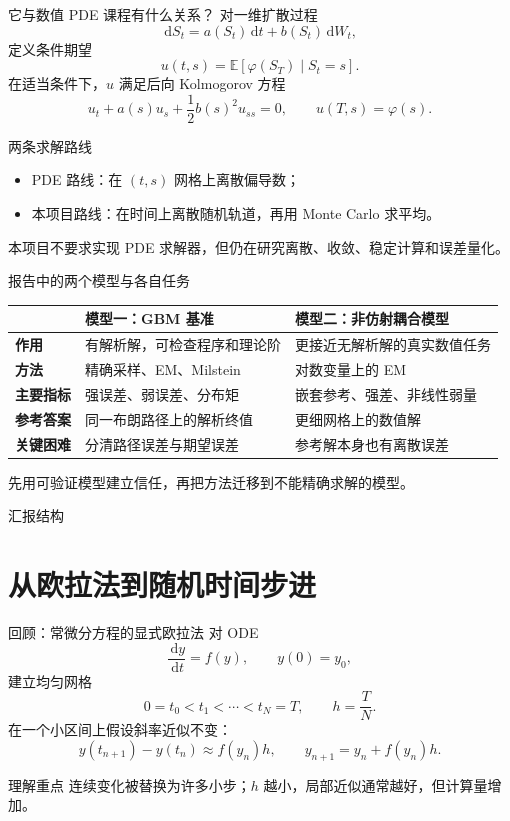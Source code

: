\documentclass[aspectratio=169,10pt,fontset=none]{ctexbeamer}
\newcommand{\E}{\mathbb{E}}
\newcommand{\dd}{\,\mathrm{d}}
\newcommand{\good}[1]{\textcolor{CourseTeal}{#1}}
\begin{document}
\begin{frame}{它与数值 PDE 课程有什么关系？}
  对一维扩散过程
  \[
    \dd S_t=a(S_t)\dd t+b(S_t)\dd W_t,
  \]
  定义条件期望
  \[
    u(t,s)=\E\!\left[\varphi(S_T)\mid S_t=s\right].
  \]
  在适当条件下，$u$ 满足后向 Kolmogorov 方程
  \[
    u_t+a(s)u_s+\frac12 b(s)^2u_{ss}=0,
    \qquad u(T,s)=\varphi(s).
  \]
  \begin{block}{两条求解路线}
    \begin{itemize}
      \item PDE 路线：在 $(t,s)$ 网格上离散偏导数；
      \item 本项目路线：在时间上离散随机轨道，再用 Monte Carlo 求平均。
    \end{itemize}
  \end{block}
  本项目不要求实现 PDE 求解器，但仍在研究\alert{离散、收敛、稳定计算和误差量化}。
\end{frame}

\begin{frame}{报告中的两个模型与各自任务}
  \begin{tabularx}{\textwidth}{>{\bfseries}p{2.4cm}XX}
    \toprule
      & 模型一：GBM 基准 & 模型二：非仿射耦合模型 \\
    \midrule
    作用 & 有解析解，可检查程序和理论阶 & 更接近无解析解的真实数值任务 \\
    方法 & 精确采样、EM、Milstein & 对数变量上的 EM \\
    主要指标 & 强误差、弱误差、分布矩 & 嵌套参考、强差、非线性弱量 \\
    参考答案 & 同一布朗路径上的解析终值 & 更细网格上的数值解 \\
    关键困难 & 分清路径误差与期望误差 & 参考解本身也有离散误差 \\
    \bottomrule
  \end{tabularx}
  \vspace{0.7em}
  \centering
  \good{先用可验证模型建立信任，再把方法迁移到不能精确求解的模型。}
\end{frame}

\begin{frame}{汇报结构}
  \tableofcontents[hideallsubsections]
\end{frame}

\section{从欧拉法到随机时间步进}

\begin{frame}{回顾：常微分方程的显式欧拉法}
  对 ODE
  \[
    \frac{\dd y}{\dd t}=f(y),\qquad y(0)=y_0,
  \]
  建立均匀网格
  \[
    0=t_0<t_1<\cdots<t_N=T,\qquad h=\frac{T}{N}.
  \]
  在一个小区间上假设斜率近似不变：
  \[
    y(t_{n+1})-y(t_n)\approx f(y_n)h,
    \qquad \boxed{y_{n+1}=y_n+f(y_n)h}.
  \]
  \begin{block}{理解重点}
    连续变化被替换为许多小步；$h$ 越小，局部近似通常越好，但计算量增加。
  \end{block}
\end{frame}
\end{document}
